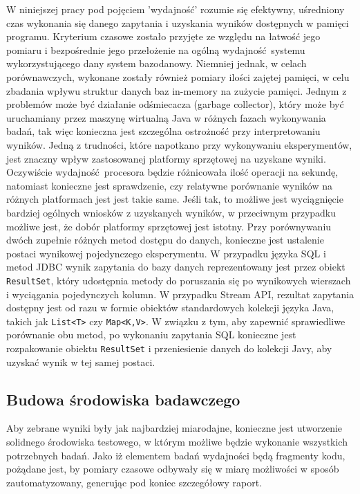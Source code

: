 \documentclass[12pt]{extarticle}
\begin{document}
    W niniejszej pracy pod pojęciem 'wydajność' rozumie się efektywny, uśredniony czas wykonania się danego zapytania i uzyskania wyników dostępnych w pamięci programu. Kryterium czasowe zostało przyjęte ze względu na łatwość jego pomiaru i bezpośrednie jego przełożenie na ogólną wydajność systemu wykorzystującego dany system bazodanowy. Niemniej jednak, w celach porównawczych, wykonane zostały również pomiary ilości zajętej pamięci, w celu zbadania wpływu struktur danych baz in-memory na zużycie pamięci. Jednym z problemów może być działanie odśmiecacza (garbage collector), który może być uruchamiany przez maszynę wirtualną Java w różnych fazach wykonywania badań, tak więc konieczna jest szczególna ostrożność przy interpretowaniu wyników.
    Jedną z trudności, które napotkano przy wykonywaniu eksperymentów, jest znaczny wpływ zastosowanej platformy sprzętowej na uzyskane wyniki. Oczywiście wydajność procesora będzie różnicowała ilość operacji na sekundę, natomiast konieczne jest sprawdzenie, czy relatywne porównanie wyników na różnych platformach jest jest takie same. Jeśli tak, to możliwe jest wyciągnięcie bardziej ogólnych wniosków z uzyskanych wyników, w przeciwnym przypadku możliwe jest, że dobór platformy sprzętowej jest istotny.
    Przy porównywaniu dwóch zupełnie różnych metod dostępu do danych, konieczne jest ustalenie postaci wynikowej pojedynczego eksperymentu. W przypadku języka SQL i metod JDBC wynik zapytania do bazy danych reprezentowany jest przez obiekt \texttt{ResultSet}, który udostępnia metody do poruszania się po wynikowych wierszach i wyciągania pojedynczych kolumn. W przypadku Stream API, rezultat zapytania dostępny jest od razu w formie obiektów standardowych kolekcji języka Java, takich jak \texttt{List<T>} czy \texttt{Map<K,V>}. W związku z tym, aby zapewnić sprawiedliwe porównanie obu metod, po wykonaniu zapytania SQL konieczne jest rozpakowanie obiektu \texttt{ResultSet} i przeniesienie danych do kolekcji Javy, aby uzyskać wynik w tej samej postaci.

\subsection{Budowa środowiska badawczego}

    Aby zebrane wyniki były jak najbardziej miarodajne, konieczne jest utworzenie solidnego środowiska testowego, w którym możliwe będzie wykonanie wszystkich potrzebnych badań. Jako iż elementem badań wydajności będą fragmenty kodu, pożądane jest, by pomiary czasowe odbywały się w miarę możliwości w sposób zautomatyzowany, generując pod koniec szczegółowy raport.
\end{document}
